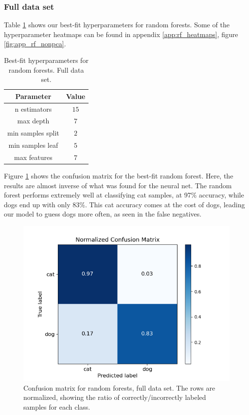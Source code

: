 \documentclass[a4paper]{article}
\begin{document}
\subsubsection{Full data set}
Table \ref{tab:best_fit_rf_nonpca} shows our best-fit hyperparameters for random forests. Some of the hyperparameter heatmaps can be found in appendix \ref{app:rf_heatmaps}, figure \ref{fig:app_rf_nonpca}.
\begin{table}[H]
  \centering
  \caption{Best-fit hyperparameters for random forests. Full data set.}
  \label{tab:best_fit_rf_nonpca}
  \begin{tabular}{c|c}
    \hline\hline
    Parameter & Value\\\hline
    n estimators &  $15$\\
    max depth &  $7$\\
    min samples split & $2$ \\
    min samples leaf  & $5$\\
    max features & $7$ %
    \end{tabular}
\end{table}
Figure \ref{fig:rf_confusion_nonpca} shows the confusion matrix for the best-fit random forest. Here, the results are almost inverse of what was found for the neural net. The random forest performs extremely well at classifying cat samples, at 97\% accuracy, while dogs end up with only 83\%. This cat accuracy comes at the cost of dogs, leading our model to guess dogs more often, as seen in the false negatives.
\begin{figure}[H]
	\centering
	\includegraphics[scale=0.6]{../figures/random_forest/confusion_matrix_nbins200_pca0_seed4155_ts0.20.png}
	\caption{Confusion matrix for random forests, full data set. The rows are normalized, showing the ratio of correctly/incorrectly labeled samples for each class.}
	\label{fig:rf_confusion_nonpca}
\end{figure}	
\end{document}
